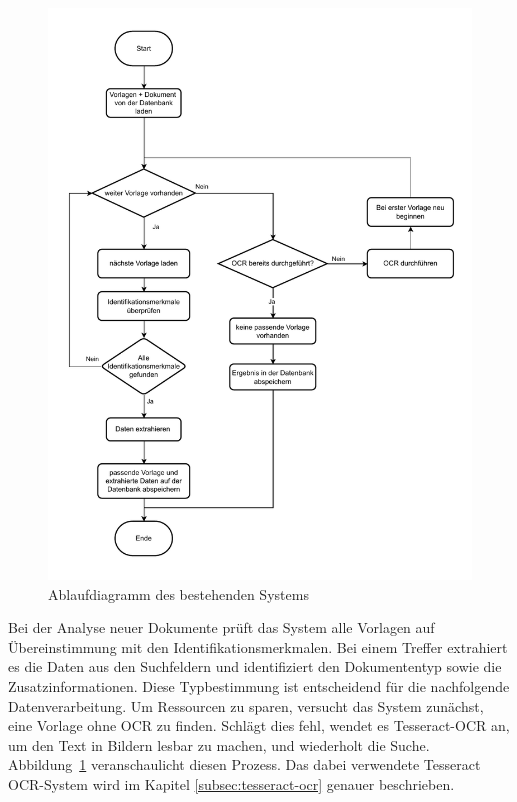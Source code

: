 \begin{figure}
    \centering
    \includegraphics[width=\textwidth]{images/AuswertungBestehendesSystem.drawio.pdf}
    \caption{Ablaufdiagramm des bestehenden Systems}
    \label{fig:auswertung-bestehendes-system}
\end{figure}

Bei der Analyse neuer Dokumente prüft das System alle Vorlagen auf Übereinstimmung mit den Identifikationsmerkmalen. Bei einem Treffer extrahiert es die Daten aus den Suchfeldern und identifiziert den Dokumententyp sowie die Zusatzinformationen. Diese Typbestimmung ist entscheidend für die nachfolgende Datenverarbeitung. Um Ressourcen zu sparen, versucht das System zunächst, eine Vorlage ohne \gls{OCR} zu finden. Schlägt dies fehl, wendet es Tesseract-\gls{OCR} an, um den Text in Bildern lesbar zu machen, und wiederholt die Suche. Abbildung~\ref{fig:auswertung-bestehendes-system} veranschaulicht diesen Prozess. Das dabei verwendete Tesseract \gls{OCR}-System wird im Kapitel \ref{subsec:tesseract-ocr} genauer beschrieben.


